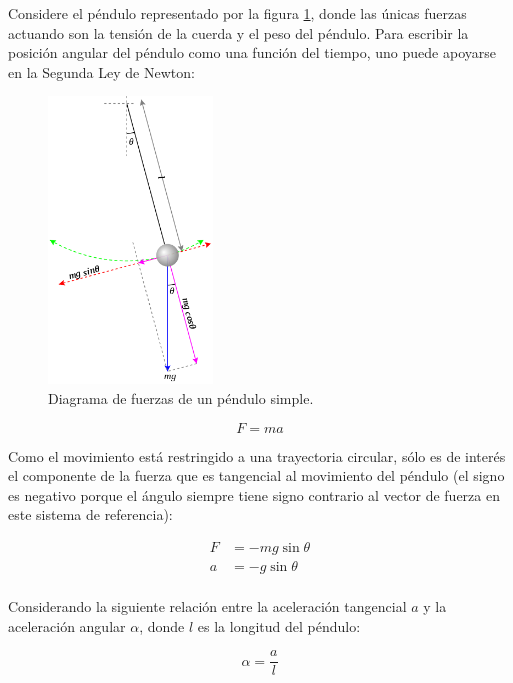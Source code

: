 \begin{ex}

    Considere el péndulo representado por la figura \ref{fig:pendulo}, donde
    las únicas fuerzas actuando son la tensión de la cuerda y el peso del
    péndulo. Para escribir la posición angular del péndulo como una función del
    tiempo, uno puede apoyarse en la Segunda Ley de Newton:

    \begin{figure}
        \centering
        \includegraphics[height=3in]{img/pendulo.png}
        \caption{Diagrama de fuerzas de un péndulo simple.}
        \label{fig:pendulo}
    \end{figure}

    \begin{equation*}
        F = ma
    \end{equation*}

    Como el movimiento está restringido a una trayectoria circular, sólo es de
    interés el componente de la fuerza que es tangencial al movimiento del
    péndulo (el signo es negativo porque el ángulo siempre tiene signo
    contrario al vector de fuerza en este sistema de referencia):

    \begin{align*}
        F &= -mg \sin \theta\\
        a &= -g \sin \theta\\
    \end{align*}

    Considerando la siguiente relación entre la aceleración tangencial $a$ y la aceleración angular $\alpha$, donde $l$ es la longitud del péndulo:

    \begin{equation*}
        \alpha = \frac{a}{l}
    \end{equation*}


\end{ex}

